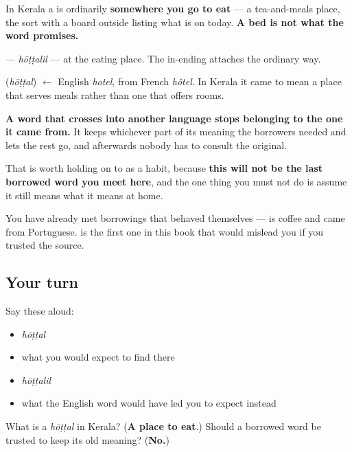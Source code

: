 In Kerala a \textbf{} is ordinarily \textbf{somewhere you go to eat} — a tea-and-meals place, the sort with a board outside listing what is on today. \textbf{A bed is not what the word promises.}

\textbf{} — \emph{hōṭṭalil} — at the eating place. The in-ending attaches the ordinary way.

\begin{cousinweb}
\textbf{} (\emph{hōṭṭal}) $\leftarrow$ English \emph{hotel}, from French \emph{hôtel}. In Kerala it came to mean a place that serves meals rather than one that offers rooms.
\end{cousinweb}

\begin{culture}
\textbf{A word that crosses into another language stops belonging to the one it came from.} It keeps whichever part of its meaning the borrowers needed and lets the rest go, and afterwards nobody has to consult the original.

That is worth holding on to as a habit, because \textbf{this will not be the last borrowed word you meet here}, and the one thing you must not do is assume it still means what it means at home.

You have already met borrowings that behaved themselves — \textbf{} is coffee and \textbf{} came from Portuguese. \textbf{} is the first one in this book that would mislead you if you trusted the source.
\end{culture}

\subsection*{Your turn}
Say these aloud:

\begin{itemize}
\raggedright
  \item \emph{hōṭṭal}
  \item what you would expect to find there
  \item \emph{hōṭṭalil}
  \item what the English word would have led you to expect instead
\end{itemize}

\begin{tcolorbox}[breakable,colback=teal!4,colframe=teal!35!black,title={Before you move on}]
What is a \emph{hōṭṭal} in Kerala? (\textbf{A place to eat}.) Should a borrowed word be trusted to keep its old meaning? (\textbf{No.})
\end{tcolorbox}
